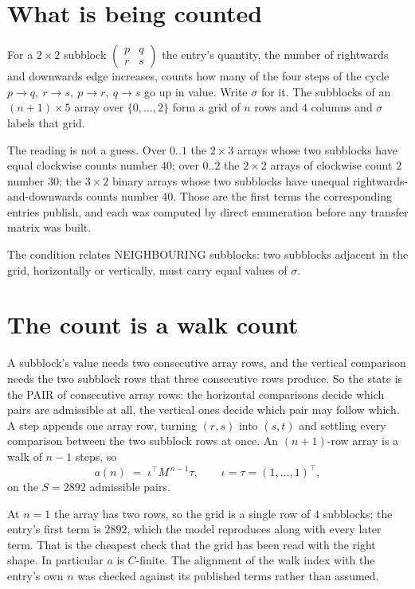 \documentclass[11pt,a4paper]{article}
\theoremstyle{plain}
\theoremstyle{definition}
\begin{document}
\section{What is being counted}

For a $2\times2$ subblock $\begin{pmatrix}p&q\\r&s\end{pmatrix}$ the
entry's quantity, the number of rightwards and downwards edge increases, counts how many of the four steps of the cycle $p\to q,\ r\to s,\ p\to r,\ q\to s$ go up in value. Write $\sigma$ for it. The subblocks of an
$(n+1)\times5$ array over $\{0,\dots,2\}$ form a grid of $n$ rows and $4$
columns and $\sigma$ labels that grid.

The reading is not a guess. Over $0..1$ the $2\times3$ arrays whose two subblocks have equal
clockwise counts number $40$; over $0..2$ the $2\times2$ arrays of clockwise count $2$ number
$30$; the $3\times2$ binary arrays whose two subblocks have unequal rightwards-and-downwards
counts number $40$. Those are the first terms the corresponding entries publish, and each was
computed by direct enumeration before any transfer matrix was built.

The condition relates NEIGHBOURING subblocks: two subblocks adjacent in the grid, horizontally
or vertically, must carry equal values of $\sigma$.

\section{The count is a walk count}

A subblock's value needs two consecutive array rows, and the vertical
comparison needs the two subblock rows that three consecutive rows produce. So the state is the
PAIR of consecutive array rows: the horizontal comparisons decide which pairs are admissible at
all, the vertical ones decide which pair may follow which. A step appends one array row,
turning $(r,s)$ into $(s,t)$ and settling every comparison between the two subblock rows at
once. An $(n+1)$-row array is a walk of $n-1$ steps, so
\[
a(n)\;=\;\iota^{\!\top}M^{\,n-1}\tau,\qquad\iota=\tau=(1,\dots,1)^{\!\top},
\]
on the $S=2892$ admissible pairs.

At $n=1$ the array has two rows, so the grid is a single row of $4$
subblocks; the entry's first term is $2892$, which the model
reproduces along with every later term. That is the cheapest check that the grid has been read
with the right shape.
In particular $a$ is $C$-finite. The alignment of the walk index with the entry's own $n$ was
checked against its published terms rather than assumed.
\end{document}
